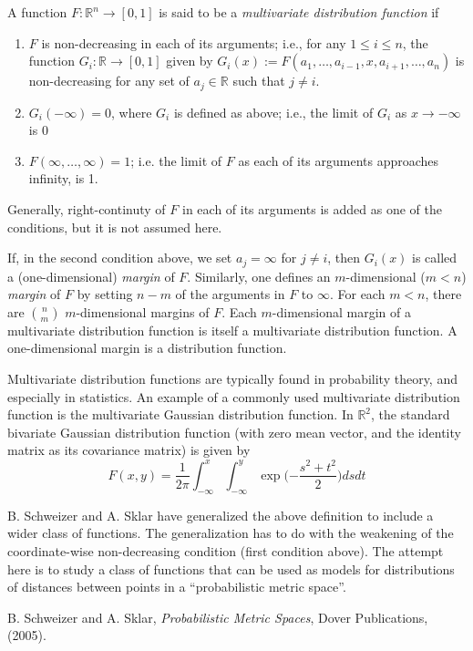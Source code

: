 \documentclass[12pt]{article}
\begin{document}
A function $F:\mathbb{R}^n\to [0,1]$ is said to be a \emph{multivariate distribution function} if
\begin{enumerate}
\item $F$ is non-decreasing in each of its arguments; i.e., for any $1\le i\le n$, the function $G_i:\mathbb{R}\to [0,1]$ given by $G_i(x):=F(a_1,\ldots,a_{i-1},x,a_{i+1},\ldots,a_n)$ is non-decreasing for any set of $a_j\in \mathbb{R}$ such that $j\ne i$.
\item $G_i(-\infty)=0$, where $G_i$ is defined as above; i.e., the limit of $G_i$ as $x\to -\infty$ is $0$
\item $F(\infty,\ldots,\infty)=1$; i.e. the limit of $F$ as each of its arguments approaches infinity, is 1.
\end{enumerate}

Generally, right-continuty of $F$ in each of its arguments is added as one of the conditions, but it is not assumed here.

If, in the second condition above, we set $a_j=\infty$ for $j\ne i$, then $G_i(x)$ is called a (one-dimensional) \emph{margin} of $F$.  Similarly, one defines an $m$-dimensional ($m<n$) \emph{margin} of $F$ by setting $n-m$ of the arguments in $F$ to $\infty$.  For each $m<n$, there are $\binom{n}{m}$ $m$-dimensional margins of $F$.  Each $m$-dimensional margin of a multivariate distribution function is itself a multivariate distribution function.  A one-dimensional margin is a distribution function.

Multivariate distribution functions are typically found in probability theory, and especially in statistics.  An example of a commonly used multivariate distribution function is the multivariate Gaussian distribution function.  In $\mathbb{R}^2$, the standard bivariate Gaussian distribution function (with zero mean vector, and the identity matrix as its covariance matrix) is given by
$$F(x,y)=\frac{1}{2\pi}\int_{-\infty}^x \int_{-\infty}^y \operatorname{exp}\big({-\frac{s^2+t^2}{2}}\big) ds dt$$

B. Schweizer and A. Sklar have generalized the above definition to include a wider class of functions.  The generalization has to do with the weakening of the coordinate-wise non-decreasing condition (first condition above).  The attempt here is to study a class of functions that can be used as models for distributions of distances between points in a ``probabilistic metric space''.

\begin{thebibliography}{8}
 B. Schweizer and A. Sklar, {\em Probabilistic Metric Spaces}, Dover Publications, (2005).
\end{thebibliography}
\end{document}
